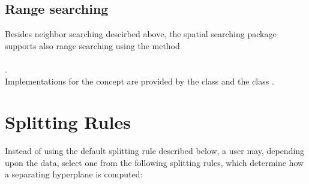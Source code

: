 \subsection{Range searching}

Besides neighbor searching descirbed above, the spatial searching package
supports also range searching using the method \\
 \\
.\\
Implementations for the concept  are provided by
the class   
and the class . 

\section{Splitting Rules}
\label{Spatial_Searching:Splitting_rule_section}

Instead of using the default splitting rule  described below,
a user may, depending upon the data, select 
one from the following splitting rules,
which determine how a separating hyperplane is computed:

